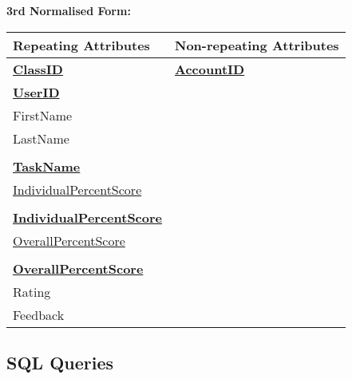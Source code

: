 \textbf{3rd Normalised Form: }

\begin{center}
\begin{tabular}{|p{4cm}|p{3cm}|} \hline
\textbf{Repeating Attributes} & \textbf{Non-repeating Attributes} \\ \hline
\textbf{\underline{ClassID}} & \textbf{\underline{AccountID}} \\
\textbf{\underline{UserID}} & \\
FirstName & \\
LastName & \\
 & \\
\textbf{\underline{TaskName}} & \\
\underline{IndividualPercentScore} & \\
& \\
\textbf{\underline{IndividualPercentScore}} & \\
\underline{OverallPercentScore} & \\
& \\
\textbf{\underline{OverallPercentScore}} & \\
Rating & \\
Feedback & \\ \hline
\end{tabular}
\end{center}

\subsection{SQL Queries}

